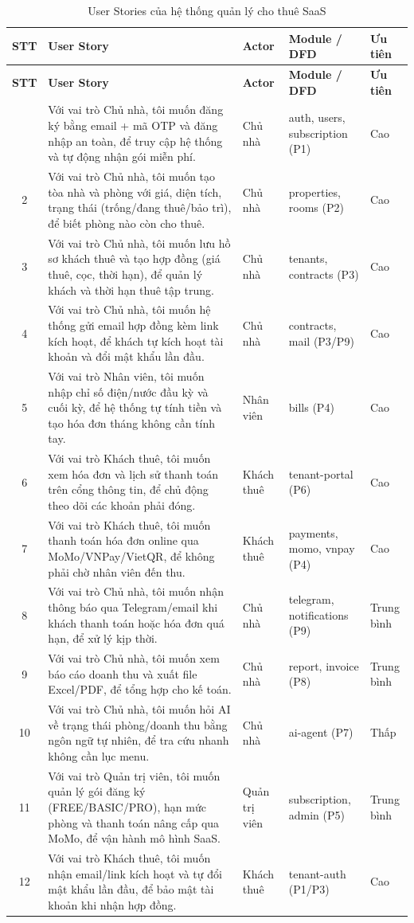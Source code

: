 \documentclass[12pt,a4paper]{report}
\begin{document}
\begin{longtable}{@{}c p{6.4cm} p{1.9cm} p{3.1cm} p{1.5cm}@{}}
  \caption{User Stories của hệ thống quản lý cho thuê SaaS}
  \label{tab:ig_userstories}\\
  \toprule
  \textbf{STT} & \textbf{User Story} & \textbf{Actor} & \textbf{Module / DFD} & \textbf{Ưu tiên} \\
  \midrule
  \endfirsthead
  \toprule
  \textbf{STT} & \textbf{User Story} & \textbf{Actor} & \textbf{Module / DFD} & \textbf{Ưu tiên} \\
  \midrule
  \endhead
  \bottomrule
  \endlastfoot
  1 & Với vai trò Chủ nhà, tôi muốn đăng ký bằng email + mã OTP và đăng nhập an toàn, để truy cập hệ thống và tự động nhận gói miễn phí. & Chủ nhà & auth, users, subscription (P1) & Cao \\
  2 & Với vai trò Chủ nhà, tôi muốn tạo tòa nhà và phòng với giá, diện tích, trạng thái (trống/đang thuê/bảo trì), để biết phòng nào còn cho thuê. & Chủ nhà & properties, rooms (P2) & Cao \\
  3 & Với vai trò Chủ nhà, tôi muốn lưu hồ sơ khách thuê và tạo hợp đồng (giá thuê, cọc, thời hạn), để quản lý khách và thời hạn thuê tập trung. & Chủ nhà & tenants, contracts (P3) & Cao \\
  4 & Với vai trò Chủ nhà, tôi muốn hệ thống gửi email hợp đồng kèm link kích hoạt, để khách tự kích hoạt tài khoản và đổi mật khẩu lần đầu. & Chủ nhà & contracts, mail (P3/P9) & Cao \\
  5 & Với vai trò Nhân viên, tôi muốn nhập chỉ số điện/nước đầu kỳ và cuối kỳ, để hệ thống tự tính tiền và tạo hóa đơn tháng không cần tính tay. & Nhân viên & bills (P4) & Cao \\
  6 & Với vai trò Khách thuê, tôi muốn xem hóa đơn và lịch sử thanh toán trên cổng thông tin, để chủ động theo dõi các khoản phải đóng. & Khách thuê & tenant-portal (P6) & Cao \\
  7 & Với vai trò Khách thuê, tôi muốn thanh toán hóa đơn online qua MoMo/VNPay/VietQR, để không phải chờ nhân viên đến thu. & Khách thuê & payments, momo, vnpay (P4) & Cao \\
  8 & Với vai trò Chủ nhà, tôi muốn nhận thông báo qua Telegram/email khi khách thanh toán hoặc hóa đơn quá hạn, để xử lý kịp thời. & Chủ nhà & telegram, notifications (P9) & Trung bình \\
  9 & Với vai trò Chủ nhà, tôi muốn xem báo cáo doanh thu và xuất file Excel/PDF, để tổng hợp cho kế toán. & Chủ nhà & report, invoice (P8) & Trung bình \\
  10 & Với vai trò Chủ nhà, tôi muốn hỏi AI về trạng thái phòng/doanh thu bằng ngôn ngữ tự nhiên, để tra cứu nhanh không cần lục menu. & Chủ nhà & ai-agent (P7) & Thấp \\
  11 & Với vai trò Quản trị viên, tôi muốn quản lý gói đăng ký (FREE/BASIC/PRO), hạn mức phòng và thanh toán nâng cấp qua MoMo, để vận hành mô hình SaaS. & Quản trị viên & subscription, admin (P5) & Trung bình \\
  12 & Với vai trò Khách thuê, tôi muốn nhận email/link kích hoạt và tự đổi mật khẩu lần đầu, để bảo mật tài khoản khi nhận hợp đồng. & Khách thuê & tenant-auth (P1/P3) & Cao \\
\end{longtable}
\end{document}
